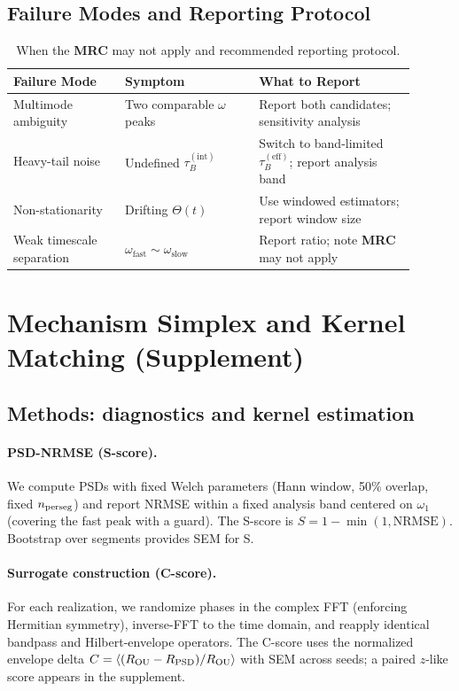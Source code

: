 \documentclass[11pt,letterpaper]{article}
\DeclareRobustCommand{\mrc}{\textbf{MRC}\xspace}
\begin{document}
\subsection*{Failure Modes and Reporting Protocol}

\begin{table}[h!]
\centering
\caption{When the \mrc may not apply and recommended reporting protocol.}
\label{tab:failures}
\begin{tabular}{@{}p{0.25\linewidth}p{0.30\linewidth}p{0.35\linewidth}@{}}
\toprule
Failure Mode & Symptom & What to Report \\
\midrule
Multimode ambiguity & Two comparable $\omega$ peaks & Report both candidates; sensitivity analysis \\
Heavy-tail noise & Undefined $\tau_B^{(\mathrm{int})}$ & Switch to band-limited $\tau_B^{(\mathrm{eff})}$; report analysis band \\
Non-stationarity & Drifting $\Theta(t)$ & Use windowed estimators; report window size \\
Weak timescale separation & $\omega_{\mathrm{fast}}\sim\omega_{\mathrm{slow}}$ & Report ratio; note \mrc may not apply \\
\bottomrule
\end{tabular}
\end{table}

\FloatBarrier
\section*{Mechanism Simplex and Kernel Matching (Supplement)}
\subsection*{Methods: diagnostics and kernel estimation}
\paragraph*{PSD-NRMSE (S-score).} We compute PSDs with fixed Welch parameters (Hann window, 50\% overlap, fixed $n_{\rm perseg}$) and report NRMSE within a fixed analysis band centered on $\omega_1$ (covering the fast peak with a guard). The S-score is $S=1-\min(1,\mathrm{NRMSE})$. Bootstrap over segments provides SEM for S.

\paragraph*{Surrogate construction (C-score).} For each realization, we randomize phases in the complex FFT (enforcing Hermitian symmetry), inverse-FFT to the time domain, and reapply identical bandpass and Hilbert-envelope operators. The C-score uses the normalized envelope delta $C=\langle (R_{\rm OU}-R_{\rm PSD})/R_{\rm OU}\rangle$ with SEM across seeds; a paired $z$-like score appears in the supplement.
\end{document}
